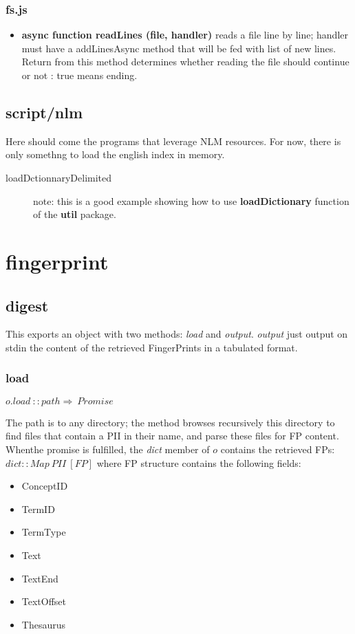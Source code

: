 \documentclass[a4paper,11pt]{report}
\newcommand{\cs}[1]{{\bfseries \ttfamily #1}}
\begin{document}
\subsubsection{fs.js}
\begin{itemize}
  \item \cs{async function readLines (file, handler)} reads a file line by line; handler must have a addLinesAsync method that will be fed with list of new lines. Return from this method determines whether reading the file should continue or not : true means ending. 
\end{itemize}
\subsection{script/nlm}
Here should come the programs that leverage NLM resources. For now, there is only somethng to load the english index in memory.
\begin{description}
\item[loadDctionnaryDelimited] note: this is a good example showing how to use \cs{loadDictionary} function of the \cs{util} package.
\end{description}
\section{fingerprint}
\subsection{digest}
This exports an object with two methods: \emph{load} and \emph{output}. \emph{output} just output on stdin the content of the retrieved FingerPrints in a tabulated format.
\subsubsection{load}
$o.load\ ::path\Rightarrow\ Promise$

The path is to any directory; the method browses recursively this directory to find files that contain a PII in their name, and parse these files for FP content. Whenthe promise is fulfilled, the \emph{dict} member of $o$ contains the retrieved FPs:
$dict::Map\ PII\ [FP]$
where FP structure contains the following fields:
\begin{itemize}
\item ConceptID
\item TermID
\item TermType
\item Text
\item TextEnd
\item TextOffset
\item Thesaurus
\end{itemize}
\end{document}

